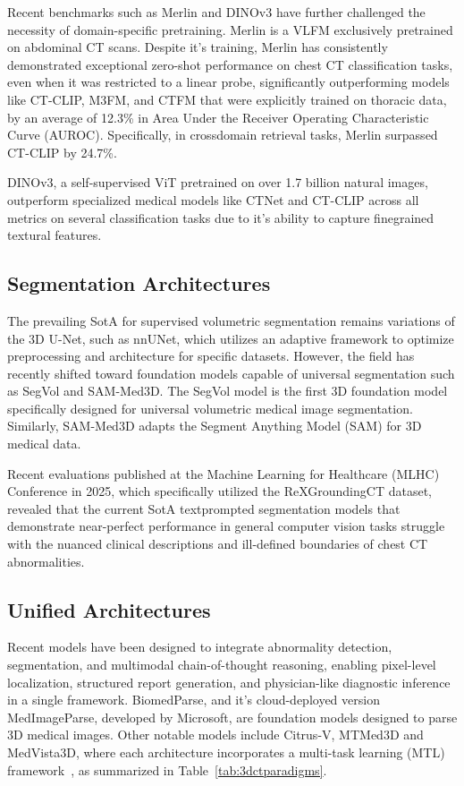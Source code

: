 Recent benchmarks such as Merlin and DINOv3 have further challenged the necessity of domain-specific pretraining.
Merlin is a VLFM exclusively pretrained on abdominal CT scans. Despite it's training, Merlin
has consistently demonstrated exceptional zero-shot performance on chest CT classification tasks, even when it was
restricted to a linear probe, significantly outperforming models like CT-CLIP, M3FM, and CTFM that were explicitly
trained on thoracic data, by an average of 12.3\% in Area Under the Receiver Operating Characteristic Curve (AUROC).
Specifically, in crossdomain retrieval tasks, Merlin surpassed CT-CLIP by 24.7\%.

DINOv3, a self-supervised ViT pretrained on over 1.7 billion natural images, outperform specialized medical models like
CTNet and CT-CLIP across all metrics on several classification tasks due to it's ability to capture finegrained textural features.

\subsection{Segmentation Architectures}
The prevailing SotA for supervised volumetric segmentation remains variations of the 3D U-Net, such as nnUNet, which
utilizes an adaptive framework to optimize preprocessing and architecture for specific datasets. However, the field has
recently shifted toward foundation models capable of universal segmentation such as SegVol and SAM-Med3D.
The SegVol model is the first 3D foundation model specifically designed for universal volumetric medical image segmentation.
Similarly, SAM-Med3D adapts the Segment Anything Model (SAM) for 3D medical data.

Recent evaluations published at the Machine Learning for Healthcare (MLHC) Conference in 2025, which specifically utilized
the ReXGroundingCT dataset, revealed that the current SotA textprompted segmentation models that demonstrate near-perfect
performance in general computer vision tasks struggle with the nuanced clinical descriptions and ill-defined boundaries
of chest CT abnormalities.

\subsection{Unified Architectures}
Recent models have been designed to integrate abnormality detection, segmentation, and multimodal chain-of-thought reasoning,
enabling pixel-level localization, structured report generation, and physician-like diagnostic inference in a single framework.
BiomedParse, and it's cloud-deployed version MedImageParse, developed by Microsoft, are foundation models designed to parse 3D
medical images.
Other notable models include Citrus-V, MTMed3D and MedVista3D, where each architecture incorporates a multi-task learning
(MTL) framework~\cite{citrusv2025,mtmed3d2025,medvista3d2025}, as summarized in Table~\ref{tab:3dctparadigms}.

